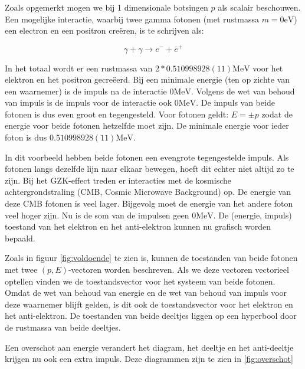 Zoals opgemerkt mogen we bij 1 dimensionale botsingen $p$ als scalair
beschouwen. Een mogelijke interactie, waarbij twee gamma fotonen (met
rustmassa $m=0\mathrm{eV}$) een electron en een positron cre\"eren,
is te schrijven als:

\begin{equation}
\gamma+\gamma\rightarrow e^{-}+\bar{e}^{+}
\end{equation}

In het totaal wordt er een rustmassa van $2*0.510998928(11)\mathrm{MeV}$
voor het elektron en het positron gecre\"eerd. Bij een minimale energie
(ten op zichte van een waarnemer) is de impuls na de interactie $0\mathrm{MeV}$.
Volgens de wet van behoud van impuls is de impuls voor de interactie
ook $0\mathrm{MeV}$. De impuls van beide fotonen is dus even groot
en tegengesteld. Voor fotonen geldt: $E=\pm p$ zodat de energie voor
beide fotonen hetzelfde moet zijn. De minimale energie voor ieder
foton is dus $0.510998928(11)\mathrm{MeV}$.

In dit voorbeeld hebben beide fotonen een evengrote tegengestelde
impuls. Als fotonen langs dezelfde lijn naar elkaar bewegen, hoeft
dit echter niet altijd zo te zijn. Bij het GZK-effect treden er interacties
met de kosmische achtergrondstraling (CMB, Cosmic Microwave Background)
op. De energie van deze CMB fotonen is veel lager. Bijgevolg moet
de energie van het andere foton veel hoger zijn. Nu is de som van
de impulsen geen $0\mathrm{MeV}$. De (energie, impuls) toestand van het
elektron en het anti-elektron kunnen nu grafisch worden bepaald.


Zoals in figuur \ref{fig:voldoende} te zien is, kunnen de toestanden van beide fotonen met twee $\left(p, 
E\right)$-vectoren worden beschreven. Als we deze vectoren vectorieel optellen
vinden we de toestandsvector voor het systeem van beide fotonen. Omdat
de wet van behoud van energie en de wet van behoud van impuls voor
deze waarnemer blijft gelden, is dit ook de toestandsvector voor het
elektron en het anti-elektron. De toestanden van beide deeltjes liggen
op een hyperbool door de rustmassa van beide deeltjes. 


Een overschot aan energie verandert het diagram, het deeltje en het anti-deeltje krijgen nu ook een extra impuls. Deze diagrammen zijn te zien in \ref{fig:overschot}



